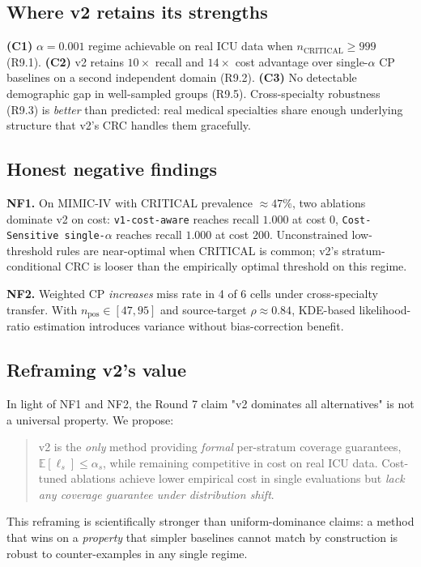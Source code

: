 \documentclass[11pt,letterpaper]{article}
\newcommand{\Ex}{\mathbb{E}}
\begin{document}
\subsection{Where v2 retains its strengths}
\textbf{(C1)} $\alpha = 0.001$ regime achievable on real ICU data when
$n_{\text{CRITICAL}} \ge 999$ (R9.1). \textbf{(C2)} v2 retains $10\times$
recall and $14\times$ cost advantage over single-$\alpha$ CP baselines on a
second independent domain (R9.2). \textbf{(C3)} No detectable demographic
gap in well-sampled groups (R9.5). Cross-specialty robustness (R9.3) is
\emph{better} than predicted: real medical specialties share enough
underlying structure that v2's CRC handles them gracefully.

\subsection{Honest negative findings}
\textbf{NF1.} On MIMIC-IV with CRITICAL prevalence $\approx 47\%$, two
ablations dominate v2 on cost: \texttt{v1-cost-aware} reaches recall
$1.000$ at cost $0$, \texttt{Cost-Sensitive single-$\alpha$} reaches recall
$1.000$ at cost $200$. Unconstrained low-threshold rules are near-optimal
when CRITICAL is common; v2's stratum-conditional CRC is looser than the
empirically optimal threshold on this regime.

\textbf{NF2.} Weighted CP \cite{Tibshirani2019} \emph{increases} miss rate
in 4 of 6 cells under cross-specialty transfer. With $n_{\text{pos}} \in
[47, 95]$ and source-target $\rho \approx 0.84$, KDE-based likelihood-ratio
estimation introduces variance without bias-correction benefit.

\subsection{Reframing v2's value}
In light of NF1 and NF2, the Round 7 claim "v2 dominates all alternatives"
is not a universal property. We propose:
\begin{quote}
v2 is the \emph{only} method providing \emph{formal} per-stratum coverage
guarantees, $\Ex[\ell_s] \le \alpha_s$, while remaining competitive in cost
on real ICU data. Cost-tuned ablations achieve lower empirical cost in
single evaluations but \emph{lack any coverage guarantee under distribution
shift}.
\end{quote}
This reframing is scientifically stronger than uniform-dominance claims: a
method that wins on a \emph{property} that simpler baselines cannot match
by construction is robust to counter-examples in any single regime.
\end{document}
